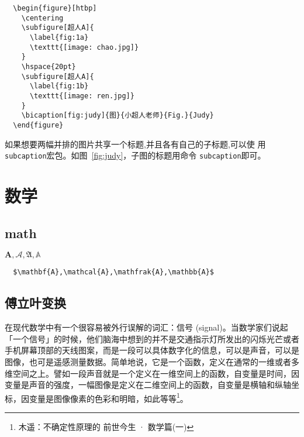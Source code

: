 \begin{figure}[htbp]
  \centering
  \hspace{20pt}
\end{figure}

\begin{lstlisting}
  \begin{figure}[htbp]
    \centering
    \subfigure[超人A]{
      \label{fig:1a}
      \texttt{[image: chao.jpg]}
    }
    \hspace{20pt}
    \subfigure[超人A]{
      \label{fig:1b}
      \texttt{[image: ren.jpg]}
    }
    \bicaption[fig:judy]{图}{小超人老师}{Fig.}{Judy}
  \end{figure}
\end{lstlisting}

如果想要两幅并排的图片共享一个标题,并且各有自己的子标题,可以使
用\texttt{subcaption}宏包。如图~\ref{fig:judy}，子图的标题用命令
\texttt{subcaption}即可。

\section{数学}

\subsection{math}

$\mathbf{A},\mathcal{A},\mathfrak{A},\mathbb{A}$

\begin{lstlisting}
  $\mathbf{A},\mathcal{A},\mathfrak{A},\mathbb{A}$
\end{lstlisting}

\subsection{傅立叶变换}

在现代数学中有一个很容易被外行误解的词汇：信号 (signal)。当数学家们说起
「一个信号」的时候，他们脑海中想到的并不是交通指示灯所发出的闪烁光芒或者
手机屏幕顶部的天线图案，而是一段可以具体数字化的信息，可以是声音，可以是
图像，也可是遥感测量数据。简单地说，它是一个函数，定义在通常的一维或者多
维空间之上。譬如一段声音就是一个定义在一维空间上的函数，自变量是时间，因
变量是声音的强度，一幅图像是定义在二维空间上的函数，自变量是横轴和纵轴坐
标，因变量是图像像素的色彩和明暗，如此等等\footnote{木遥：不确定性原理的
  前世今生 · 数学篇(一)}。

